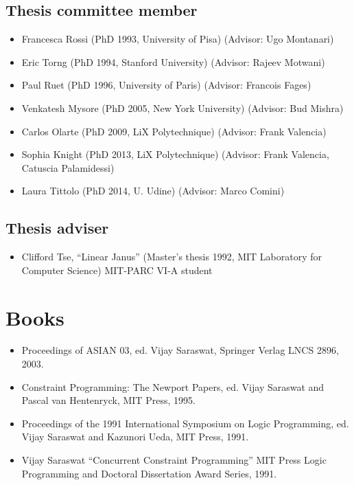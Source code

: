 \documentclass{article}
\begin{document}
\subsection*{Thesis committee member}
\begin{itemize}
\item  Francesca Rossi (PhD 1993, University of Pisa) (Advisor: Ugo Montanari)
\item  Eric Torng (PhD 1994, Stanford University) (Advisor: Rajeev Motwani)
\item  Paul Ruet (PhD 1996, University of Paris) (Advisor: Francois Fages)
\item  Venkatesh Mysore (PhD 2005, New York University) (Advisor: Bud Mishra)
\item  Carlos Olarte (PhD 2009, LiX Polytechnique) (Advisor: Frank
  Valencia)
\item  Sophia Knight (PhD 2013, LiX Polytechnique) (Advisor: Frank
  Valencia, Catuscia Palamidessi)
\item Laura Tittolo (PhD 2014, U. Udine) (Advisor: Marco Comini)
\end{itemize}

\subsection*{Thesis adviser}
\begin{itemize}
\item  Clifford Tse, ``Linear Janus'' (Master's thesis 1992, MIT Laboratory for
  Computer Science) MIT-PARC VI-A student
\end{itemize}

\section*{Books}
\begin{itemize}

\item Proceedings of ASIAN 03, ed.{} Vijay Saraswat, Springer Verlag
  LNCS 2896, 2003.

\item  Constraint Programming: The Newport Papers, ed.{} Vijay
  Saraswat and Pascal van Hentenryck, MIT Press, 1995.

\item   Proceedings of the 1991 International Symposium on Logic
  Programming, ed.{} Vijay Saraswat and Kazunori Ueda, MIT Press,
  1991.

\item   Vijay Saraswat ``Concurrent Constraint Programming'' MIT
  Press Logic Programming and Doctoral Dissertation Award Series,
  1991.

\end{itemize}
\end{document}
